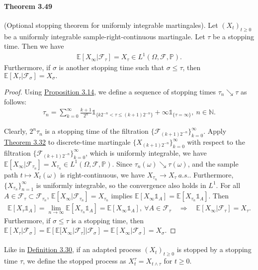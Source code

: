 \documentclass{article}
\numberwithin{equation}{section}
\newcommand{\E}{\mathbb{E}}
\renewcommand{\P}{\mathbb{P}}
\theoremstyle{plain}
\theoremstyle{definition}
\begin{document}
\paragraph{Theorem 3.49\label{thm:3.49}} (Optional stopping theorem for uniformly integrable martingales). Let $(X_t)_{t\geq 0}$ be a uniformly integrable sample-right-continuous martingale. Let $\tau$ be a stopping time. Then we have
\begin{align*}
	\E[X_\infty|\mathscr{F}_\tau]=X_\tau\in L^1(\Omega,\mathscr{F},\P).
\end{align*}
Furthermore, if $\sigma$ is another stopping time such that $\sigma\leq\tau$, then $\E[X_\tau|\mathscr{F}_\sigma]=X_\sigma.$
\begin{proof}
Using \hyperref[prop:3.14]{Proposition 3.14}, we define a sequence of stopping times $\tau_n\searrow\tau$ as follows:
\begin{align*}
	\tau_n=\sum_{k=0}^\infty\frac{k+1}{2^n}\mathds{1}_{\{k2^{-n}<\tau\leq(k+1)2^{-n}\}}+\infty\mathds{1}_{\{\tau=\infty\}},\ n\in\mathbb{N}.
\end{align*}

Clearly, $2^n\tau_n$ is a stopping time of the filtration $\{\mathscr{F}_{(k+1)2^{-n}}\}_{k=0}^\infty$. Apply \hyperref[thm:3.32]{Theorem 3.32} to discrete-time martingale $\{X_{(k+1)2^{-n}}\}_{k=0}^\infty$ with respect to the filtration $\{\mathscr{F}_{(k+1)2^{-n}}\}_{k=0}^\infty$, which is uniformly integrable, we have $\E[X_\infty|\mathscr{F}_{\tau_n}]=X_{\tau_n}\in L^1(\Omega,\mathscr{F},\P)$. Since $\tau_n(\omega)\searrow\tau(\omega)$, and the sample path $t\mapsto X_t(\omega)$ is right-continuous, we have $X_{\tau_n}\to X_\tau\ a.s.$. Furthermore, $\{X_{\tau_n}\}_{n=1}^\infty$ is uniformly integrable, so the convergence also holds in $L^1$. For all $A\in\mathscr{F}_\tau\subset\mathscr{F}_{\tau_n}$, $\E[X_\infty|\mathscr{F}_{\tau_n}]=X_{\tau_n}$ implies $\E[X_\infty\mathds{1}_A]=\E[X_{\tau_n}\mathds{1}_A]$. Then
\begin{align*}
	\E[X_\tau\mathds{1}_A] = \lim_{n\to\infty}\E\left[X_{\tau_n}\mathds{1}_A\right] = \E[X_\infty\mathds{1}_A],\ \forall A\in\mathscr{F}_\tau\quad \Rightarrow\quad \E[X_\infty|\mathscr{F}_\tau]=X_\tau.
\end{align*}
Furthermore, if $\sigma\leq\tau$ is a stopping time, then $\E[X_\tau|\mathscr{F}_\sigma]=\E\left[\E[X_\infty|\mathscr{F}_\tau]|\mathscr{F}_\sigma\right]=\E[X_\infty|\mathscr{F}_\sigma]=X_\sigma$.
\end{proof}

\paragraph{} Like in \hyperref[def:3.30]{Definition 3.30}, if an adapted process $(X_t)_{t\geq 0}$ is stopped by a stopping time $\tau$, we define the stopped process as $X_t^\tau = X_{t\wedge\tau}$ for $t\geq 0$.
\end{document}
